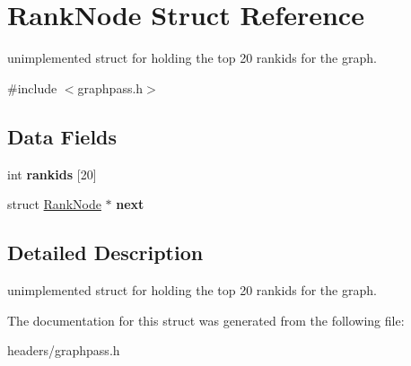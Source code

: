 \hypertarget{struct_rank_node}{}\section{Rank\+Node Struct Reference}
\label{struct_rank_node}


unimplemented struct for holding the top 20 rankids for the graph.  




{\ttfamily \#include $<$graphpass.\+h$>$}

\subsection*{Data Fields}
\begin{DoxyCompactItemize}
\item 
\mbox{\label{struct_rank_node_ace2aba3cae9ab3c83c32aae0ab75e8d7}} 
int {\bfseries rankids} \mbox{[}20\mbox{]}
\item 
\mbox{\label{struct_rank_node_a236b0a38592ebd2115bd73eca8d13ba9}} 
struct \mbox{\hyperlink{struct_rank_node}{Rank\+Node}} $\ast$ {\bfseries next}
\end{DoxyCompactItemize}


\subsection{Detailed Description}
unimplemented struct for holding the top 20 rankids for the graph. 

The documentation for this struct was generated from the following file\+:\begin{DoxyCompactItemize}
\item 
headers/graphpass.\+h\end{DoxyCompactItemize}
